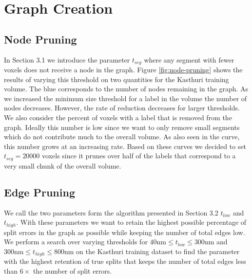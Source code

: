 
\section{Graph Creation}

\subsection{Node Pruning}

In Section 3.1 we introduce the parameter $t_{seg}$ where any segment with fewer voxels does not receive a node in the graph.
Figure \ref{fig:node-pruning} shows the results of varying this threshold on two quantities for the Kasthuri training volume. 
The blue corresponds to the number of nodes remaining in the graph.
As we increased the minimum size threshold for a label in the volume the number of nodes decreases.
However, the rate of reduction decreases for larger thresholds.
We also consider the percent of voxels with a label that is removed from the graph.
Ideally this number is low since we want to only remove small segments which do not contribute much to the overall volume.
As also seen in the curve, this number grows at an increasing rate. 
Based on these curves we decided to set $t_{seg} = 20000$ voxels since it prunes over half of the labels that correspond to a very small chunk of the overall volume. 

\subsection{Edge Pruning}

We call the two parameters form the algorithm presented in Section 3.2 $t_{low}$ and $t_{high}$. 
With these parameters we want to retain the highest possible percentage of split errors in the graph as possible while keeping the number of total edges low. 
We perform a search over varying thresholds for $40\textrm{nm} \leq t_{low} \leq 300 \textrm{nm}$ and $300 \textrm{nm} \leq t_{high} \leq 800 \textrm{nm}$ on the Kasthuri training dataset to find the parameter with the highest retention of true splits that keeps the number of total edges less than $6 \times$ the number of split errors. 

